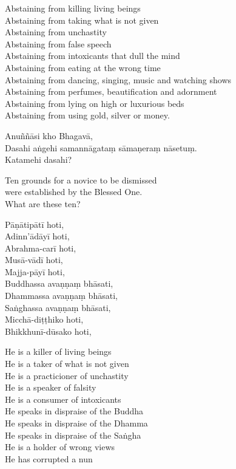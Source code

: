 \begin{english}
  Abstaining from killing living beings\\
  Abstaining from taking what is not given\\
  Abstaining from unchastity\\
  Abstaining from false speech\\
  Abstaining from intoxicants that dull the mind\\
  Abstaining from eating at the wrong time\\
  Abstaining from dancing, singing, music and watching shows\\
  Abstaining from perfumes, beautification and adornment\\
  Abstaining from lying on high or luxurious beds\\
  Abstaining from using gold, silver or money.
\end{english}


\clearpage

Anuññāsi kho Bhagavā,\\
Dasahi aṅgehi samannāgataṃ sāmaṇeraṃ nāsetuṃ.\\
Katamehi dasahi?

\begin{english}
  Ten grounds for a novice to be dismissed\\
  were established by the Blessed One.\\
  What are these ten?
\end{english}

Pāṇātipātī hoti,\\
Adinn'ādāyī hoti,\\
Abrahma-carī hoti,\\
Musā-vādī hoti,\\
Majja-pāyī hoti,\\
Buddhassa avaṇṇaṃ bhāsati,\\
Dhammassa avaṇṇaṃ bhāsati,\\
Saṅghassa avaṇṇaṃ bhāsati,\\
Micchā-diṭṭhiko hoti,\\
Bhikkhunī-dūsako hoti,

\begin{english}
  He is a killer of living beings\\
  He is a taker of what is not given\\
  He is a practicioner of unchastity\\
  He is a speaker of falsity\\
  He is a consumer of intoxicants\\
  He speaks in dispraise of the Buddha\\
  He speaks in dispraise of the Dhamma\\
  He speaks in dispraise of the Saṅgha\\
  He is a holder of wrong views\\
  He has corrupted a nun
\end{english}

